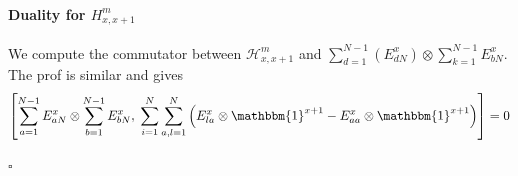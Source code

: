\documentclass[10pt]{article}
\numberwithin{equation}{section}
\numberwithin{equation}{subsection}
\begin{document}
\paragraph{Duality for $H_{x,x+1}^{m}$} We compute the commutator between $\mathcal{H}_{x,x+1}^{m}$ and $\sum_{d=1}^{N-1}(E_{dN}^{x})\otimes \sum_{k=1}^{N-1}E_{bN}^{x}$. The prof is similar and gives
\begin{equation}
	\left[\sum_{a=1}^{N-1}E_{aN}^{x}\otimes \sum_{b=1}^{N-1}E_{bN}^{x},\;\sum_{i=1}^{N}\sum_{a,l=1}^{N}\left(E_{la}^{x}\otimes \mathbbm{1}^{x+1}-E_{aa}^{x}\otimes \mathbbm{1}^{x+1}\right)\right]=0
\end{equation}
\begin{flushright}
	$\square$
\end{flushright}

\end{document}
